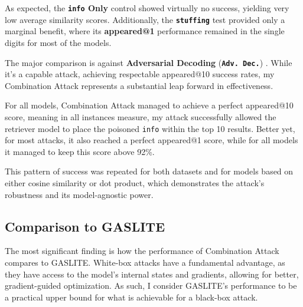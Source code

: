 \documentclass[a4paper, sigconf]{acmart}
\begin{document}
As expected, the \textbf{\texttt{info} Only} control showed virtually no success, yielding very low average similarity scores. Additionally, the \textbf{\texttt{stuffing}} test provided only a marginal benefit, where its \textbf{appeared@1} performance remained in the single digits for most of the models.

The major comparison is against \textbf{Adversarial Decoding} (\textbf{\texttt{Adv. Dec.}}) \cite{zhang2025-adv}. While it's a capable attack, achieving respectable appeared@10 success rates, my Combination Attack represents a substantial leap forward in effectiveness. 

For all models, Combination Attack managed to achieve a perfect appeared@10 score, meaning in all instances measure, my attack successfully allowed the retriever model to place the poisoned \texttt{info} within the top 10 results. Better yet, for most attacks, it also reached a perfect appeared@1 score, while for all models it managed to keep this score above 92\%. 

This pattern of success was repeated for both datasets and for models based on either cosine similarity or dot product, which demonstrates the attack's robustness and its model-agnostic power. 


\subsection{Comparison to GASLITE}

The most significant finding is how the performance of Combination Attack compares to GASLITE. White-box attacks have a fundamental advantage, as they have access to the model's internal states and gradients, allowing for better, gradient-guided optimization. As such, I consider GASLITE's performance to be a practical upper bound for what is achievable for a black-box attack. 
\end{document}
